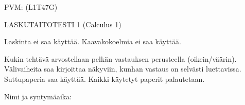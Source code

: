\documentclass[finnish, a4paper, 12pt]{article}
\begin{document}
	
	
		PVM: \underline{\phantom{mm.mm.}}
		\hfill
		(L1T47G)	%
	
	\begin{center}
		{\large
			LASKUTAITOTESTI 1 (Calculus 1)}
	\end{center}
	
	Laskinta ei saa käyttää. Kaavakokoelmia ei saa käyttää.
	
	Kukin tehtävä arvostellaan pelkän vastauksen perusteella (oikein/väärin).
	Välivaiheita saa kirjoittaa näkyviin, kunhan vastaus on selvästi luettavissa.
	Suttupaperia saa käyttää. Kaikki käytetyt paperit palautetaan.
	
\vspace{12pt}
Nimi ja syntymäaika: \phantom{m} \hrulefill
\vspace{8pt}
	
\end{document}
